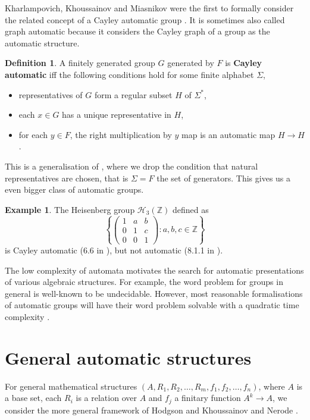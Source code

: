 \documentclass[british,a4paper,11pt,abstract=on]{scrreprt}
\theoremstyle{definition}
\newtheorem{definition}[theorem]{Definition}
\newtheorem{example}[theorem]{Example}
\theoremstyle{remark}
\newcommand{\set}[1]{\left\{ #1 \right\}}
\newcommand{\Z}{\mathbb{Z}}
\begin{document}
Kharlampovich, Khoussainov and Miasnikov were the first to formally consider the related concept of a Cayley automatic group \autocite{KKM}.
It is sometimes also called graph automatic because it considers the Cayley graph of a group as the automatic structure.
\begin{definition} \label{Cayley automatic group}
    A finitely generated group \(G\) generated by \(F\) is \textbf{Cayley automatic} iff
    the following conditions hold for some finite alphabet \(\Sigma\),
    \begin{itemize}
        \item representatives of \(G\) form a regular subset \(H\) of \(\Sigma^*\),
        \item each \(x\in G\) has a unique representative in \(H\),
        \item for each \(y\in F\), the right multiplication by \(y\) map is an automatic map \(H\to H\).
    \end{itemize}
\end{definition}
This is a generalisation of , where we drop the condition that natural representatives are chosen, that is \(\Sigma = F\) the set of generators.
This gives us a even bigger class of automatic groups.
\begin{example}
    The Heisenberg group \(\mathcal{H}_3(\Z)\) defined as
    \[\set{\begin{pmatrix}1&a&b\\0&1&c\\0&0&1\end{pmatrix}: a,b,c\in\Z}\]
    is Cayley automatic (6.6 in \autocite{KKM}), but not automatic (8.1.1 in \autocite{Epstein}).
\end{example}

The low complexity of automata motivates the search for automatic presentations of various algebraic structures.
For example,
the word problem for groups in general is well-known to be undecidable.
However, most reasonable formalisations of automatic groups will have their word problem solvable with a
quadratic time complexity \autocite{Epstein,KKM}.

\section{General automatic structures}

For general mathematical structures \((A, R_1, R_2, \dots, R_m, f_1, f_2, \dots, f_n)\),
where \(A\) is a base set, each \(R_i\) is a relation over \(A\) and \(f_j\) a finitary function \(A^k\to A\),
we consider the more general framework of Hodgson \autocite{Ho76,Ho83} and Khoussainov and Nerode \autocite{KN}.
\end{document}
